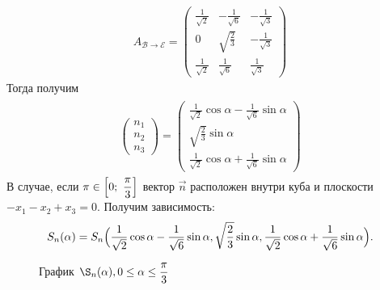 \documentclass[12pt,a4paper]{article}
\begin{document}
\begin{gather*}
	A_{\mathcal{B} \rightarrow \mathcal{E}}=
	\begin{pmatrix}
  \frac{1}{\sqrt{2}} & -\frac{1}{\sqrt{6}} & -\frac{1}{\sqrt{3}}\\
  0 & \sqrt{\frac{2}{3}} & -\frac{1}{\sqrt{3}}\\
\frac{1}{\sqrt{2}} & \frac{1}{\sqrt{6}} & \frac{1}{\sqrt{3}}
\end{pmatrix} 
	\end{gather*}
 Тогда получим
 \begin{gather*}
		\begin{align}
			\begin{pmatrix}
				   n_{1} \\
				   n_{2} \\
				   n_{3}
				 \end{pmatrix} =
				 \begin{pmatrix}
					\frac{1}{\sqrt{2}}\cos{\alpha} -\frac{1}{\sqrt{6}}\sin{\alpha} \\
  \sqrt{\frac{2}{3}}\sin{\alpha}\\
  \frac{1}{\sqrt{2}}\cos{\alpha} + \frac{1}{\sqrt{6}}\sin{\alpha} 
\end{pmatrix}
 \end{align}
 \end{gather*}
 В случае, если $\pi \in \Bigl[0;~\dfrac{\pi}{3}\Bigr]$ вектор $\vec{n}$ расположен внутри куба и плоскости $-x_{1}-x_{2}+x_{3}=0.$ Получим зависимость:
 \[
	S_n(\alpha) = S_n \Bigl( \dfrac{1}{\sqrt 2} \cos \alpha - \dfrac{1}{\sqrt 6} \sin \alpha, \sqrt{\dfrac{2}{3}} \sin \alpha, \dfrac{1}{\sqrt 2} \cos \alpha + \dfrac{1}{\sqrt 6} \sin \alpha \Bigr).
 \] 

 \begin{figure}[h]
	\caption{График $\S_n(\alpha), 0 \leq \alpha \leq \dfrac{\pi}{3}$}
	\label{pic:FeOpt2}
\end{figure}
\end{document}
